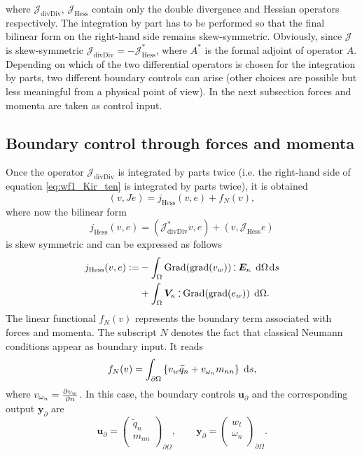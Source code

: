 \documentclass[letterpaper, 10 pt, conference]{ieeeconf}
\def\onedot{$\mathsurround0pt\ldotp$}
\def\cddot{%
	\mathbin{\vcenter{\baselineskip.67ex
			\hbox{\onedot}\hbox{\onedot}}%
}}
\begin{document}
where $\mathcal{J}_{\mathrm{divDiv}}, \, \mathcal{J}_{\mathrm{Hess}}$ contain only the double divergence and Hessian operators respectively. The integration by part has to be performed so that the final bilinear form on the right-hand side remains skew-symmetric. Obviously, since $\mathcal{J}$ is skew-symmetric $\mathcal{J}_{\mathrm{divDiv}} = - \mathcal{J}_{\mathrm{Hess}}^*$, where $A^*$ is the formal adjoint of operator $A$. Depending on which of the two differential operators is chosen for the integration by parts, two different boundary controls can arise \cite{BrugnoliKir} (other choices are possible but less meaningful from a physical point of view). In the next subsection forces and momenta are taken as control input.


\subsection{Boundary control through forces and momenta}
\label{subsec:controlForces}
Once the operator $\mathcal{J}_{\mathrm{divDiv}}$ is integrated by parts twice (i.e. the right-hand side of equation \eqref{eq:wf1_Kir_ten} is integrated by parts twice), it is obtained 
\begin{equation}
\label{eq:WF_Neum}
(v, Je) = j_{\mathrm{Hess}}(v, e) + f_{N}(v),
\end{equation}
where now the bilinear form 
\[j_{\mathrm{Hess}}(v, e) = (\mathcal{J}_{\mathrm{divDiv}}^* v, e) + (v, \mathcal{J}_{\mathrm{Hess}}e) \] 
is skew symmetric and can be expressed as follows
\begin{equation} \label{eq:j_allgrad}
\begin{aligned}
j_{\mathrm{Hess}}(v, e): =  &-  \displaystyle\int_{\Omega} \mathrm{Grad}(\mathrm{grad}(v_w))  \cddot \bm{E}_{\kappa} \, \d\Omega \d{s}\\
&+ \displaystyle\int_{\Omega} \bm{V}_{\kappa} \cddot \mathrm{Grad}(\mathrm{grad}(e_w)) \, \d\Omega. 
\end{aligned}
\end{equation}
The linear functional $f_{N}(v)$ represents the boundary term associated with forces and momenta. The subscript $N$ denotes the fact that classical Neumann conditions appear as boundary input. It reads
\begin{equation} \label{eq:Neum_funct}
f_{N}(v) =  \displaystyle\int_{\partial \Omega} \left\{ v_w \widetilde{q}_n +  v_{\omega_n} m_{nn} \right\}  \d{s},
\end{equation}
where $ v_{\omega_n}=\diffp{v_w}{n}$. In this case, the boundary controls $\bm{u}_\partial$ and the corresponding output $\bm{y}_\partial$ are 
\[\bm{u}_\partial = 
\begin{pmatrix}
\widetilde{q}_n \\
m_{nn} \\
\end{pmatrix}_{\partial \Omega}, \qquad
\bm{y}_\partial = 
\begin{pmatrix}
w_t \\
\omega_n \\
\end{pmatrix}_{\partial \Omega}.
\]
\end{document}
